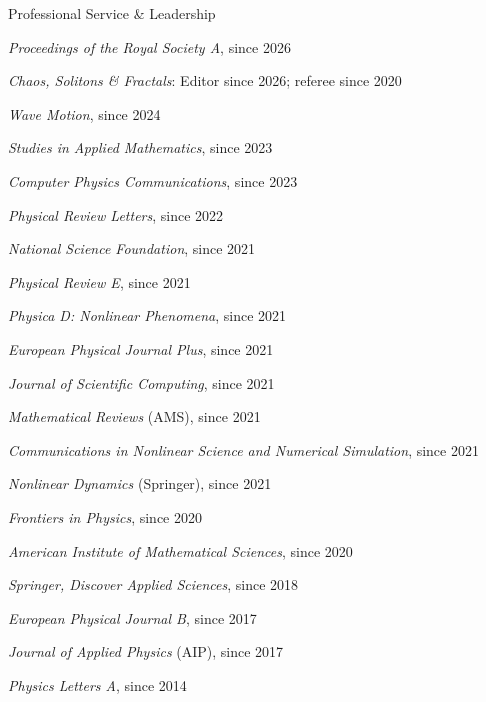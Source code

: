 \documentclass[10pt]{article} %
\newenvironment{outerlist}[1][\enskip\textbullet]%
        {\begin{itemize}[#1]}{\end{itemize}%
         \vspace{-.6\baselineskip}}
\newenvironment{innerlist}[1][\enskip\textbullet]%
        {\begin{compactitem}[#1]}{\end{compactitem}}
\begin{document}
\begin{section}{Professional Service \& Leadership}
\begin{outerlist}
\begin{innerlist}
\item[$\triangleright$] \textit{Proceedings of the Royal Society A}, since 2026
\item[$\triangleright$] \textit{Chaos, Solitons \& Fractals}: Editor since 2026; referee since 2020
\item[$\triangleright$] \textit{Wave Motion}, since 2024
\item[$\triangleright$] \textit{Studies in Applied Mathematics}, since 2023
\item[$\triangleright$] \textit{Computer Physics Communications}, since 2023
\item[$\triangleright$] \textit{Physical Review Letters}, since 2022
\item[$\triangleright$] \textit{National Science Foundation}, since 2021
\item[$\triangleright$] \textit{Physical Review E}, since 2021
\item[$\triangleright$] \textit{Physica D: Nonlinear Phenomena}, since 2021
\item[$\triangleright$] \textit{European Physical Journal Plus}, since 2021
\item[$\triangleright$] \textit{Journal of Scientific Computing}, since 2021
\item[$\triangleright$] \textit{Mathematical Reviews} (AMS), since 2021
\item[$\triangleright$] \textit{Communications in Nonlinear Science and Numerical Simulation}, since 2021
\item[$\triangleright$] \textit{Nonlinear Dynamics} (Springer), since 2021
\item[$\triangleright$] \textit{Frontiers in Physics}, since 2020
\item[$\triangleright$] \textit{American Institute of Mathematical Sciences}, since 2020
\item[$\triangleright$] \textit{Springer, Discover Applied Sciences}, since 2018
\item[$\triangleright$] \textit{European Physical Journal B}, since 2017
\item[$\triangleright$] \textit{Journal of Applied Physics} (AIP), since 2017
\item[$\triangleright$] \textit{Physics Letters A}, since 2014
\end{innerlist}

\end{outerlist}

\end{section}
\end{document}
